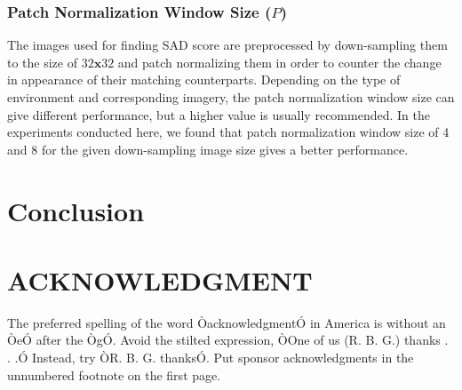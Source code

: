 \documentclass[letterpaper, 10 pt, conference]{ieeeconf}  %
\begin{document}
\subsubsection{Patch Normalization Window Size ($P$)}
The images used for finding SAD score are preprocessed by down-sampling them to the size of $32\mathbf{x}32$ and patch normalizing them in order to counter the change in appearance of their matching counterparts. Depending on the type of environment and corresponding imagery, the patch normalization window size can give different performance, but a higher value is usually recommended. In the experiments conducted here, we found that patch normalization window size of 4 and 8 for the given down-sampling image size gives a better performance.

\section{Conclusion}

\addtolength{\textheight}{-12cm}   %

\section*{ACKNOWLEDGMENT}

The preferred spelling of the word ÒacknowledgmentÓ in America is without an ÒeÓ after the ÒgÓ. Avoid the stilted expression, ÒOne of us (R. B. G.) thanks . . .Ó  Instead, try ÒR. B. G. thanksÓ. Put sponsor acknowledgments in the unnumbered footnote on the first page.



\end{document}
